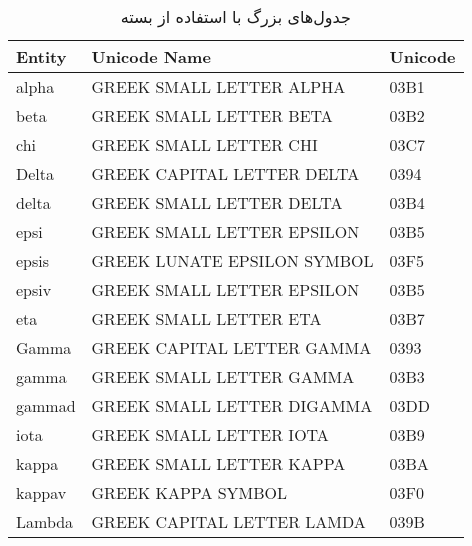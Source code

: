 \begin{latin}
\begin{longtable}{@{}lll}
\caption{جدول‌های بزرگ با استفاده از بسته }\\
   \bfseries Entity&\bfseries  Unicode Name&\bfseries  Unicode\\ \hline
\endfirsthead
\endlastfoot
alpha              & GREEK SMALL LETTER ALPHA            & 03B1\\
beta               & GREEK SMALL LETTER BETA             & 03B2\\
chi                & GREEK SMALL LETTER CHI              & 03C7\\
\pagebreak
Delta              & GREEK CAPITAL LETTER DELTA          & 0394\\
delta              & GREEK SMALL LETTER DELTA            & 03B4\\
epsi               & GREEK SMALL LETTER EPSILON          & 03B5\\
epsis              & GREEK LUNATE EPSILON SYMBOL         & 03F5\\
epsiv              & GREEK SMALL LETTER EPSILON          & 03B5\\
eta                & GREEK SMALL LETTER ETA              & 03B7\\
Gamma              & GREEK CAPITAL LETTER GAMMA          & 0393\\
gamma              & GREEK SMALL LETTER GAMMA            & 03B3\\
gammad             & GREEK SMALL LETTER DIGAMMA          & 03DD\\
iota               & GREEK SMALL LETTER IOTA             & 03B9\\
kappa              & GREEK SMALL LETTER KAPPA            & 03BA\\
kappav             & GREEK KAPPA SYMBOL                  & 03F0\\
Lambda             & GREEK CAPITAL LETTER LAMDA          & 039B\\

\end{longtable}
\end{latin}
